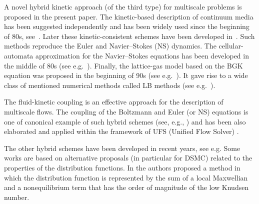 \documentclass[]{elsarticle} %
\begin{document}
A novel hybrid kinetic approach (of the third type) for multiscale problems is proposed in the present paper. The kinetic-based description of continuum media has been suggested independently and has been widely used since the beginning of 80s, see~\cite{Potkin1975, Pullin1980, Reitz1981, Aristov1983}. Later these kinetic-consistent schemes have been developed in~\cite{Elizarova1985, Deshpande1986, Prendergast1993, Chou1997, Ohwada2002, Ohwada2004Xu, Ohwada2004Kobayashi, Ohwada2006}. Such methods reproduce the Euler and Navier–Stokes (NS) dynamics. The cellular-automata approximation for the Navier–Stokes equations has been developed in the middle of 80s (see e.g.~\cite{Frisch1986}). Finally, the lattice-gas model based on the BGK equation was proposed in the beginning of 90s (see e.g.~\cite{Qian1992}). It gave rise to a wide class of mentioned numerical methods called LB methods (see e.g.~\cite{Succi2001}).

The fluid-kinetic coupling is an effective approach for the description of multiscale flows. The coupling of the Boltzmann and Euler (or NS) equations is one of canonical example of such hybrid schemes (see, e.g., \cite{Bourgat1996} \cite{Tallec1997}) and has been also elaborated and applied within the framework of UFS (Unified Flow Solver) \cite{Kolobov2007}.

The other hybrid schemes have been developed in recent years, see e.g. \cite{Xu2010} Some works are based on alternative proposals (in particular for DSMC) related to the properties of the distribution functions. In \cite{Larina2005} the authors proposed a method in which the distribution function is represented by the sum of a local Maxwellian and a nonequilibrium term that has the order of magnitude of the low Knudsen number.
\end{document}
